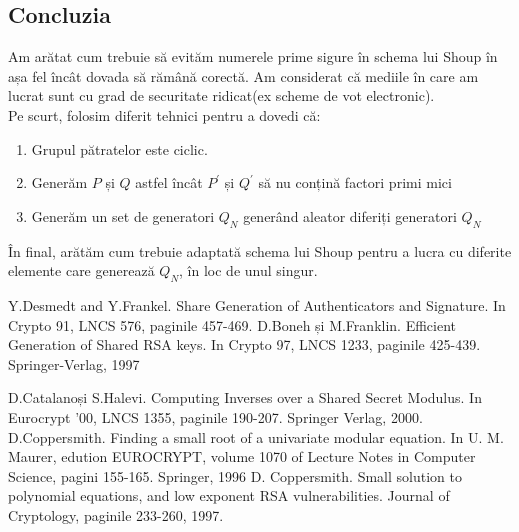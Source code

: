 \documentclass[12]{article}
\begin{document}
\subsection{Concluzia}
Am arătat cum trebuie să evităm numerele prime sigure în schema lui Shoup în așa fel încât dovada să rămână corectă. Am considerat că mediile în care am lucrat sunt cu grad de securitate ridicat(ex scheme de vot electronic).
\\ Pe scurt, folosim diferit tehnici pentru a dovedi că:
\begin{enumerate}
\item Grupul pătratelor este ciclic.

\item Generăm $P$ și $Q$ astfel încât $P^{'}$ și $Q^{'}$ să nu conțină factori primi mici

\item Generăm un set de generatori $Q_N$ generând aleator diferiți generatori $Q_N$
\end{enumerate} 
În final, arătăm cum trebuie adaptată schema lui Shoup pentru a lucra cu diferite elemente care generează $Q_N$, în loc de unul singur.








\medskip


\begin{thebibliography}{9}
Y.Desmedt and Y.Frankel. Share Generation of Authenticators and Signature. In Crypto 91, LNCS 576, paginile 457-469.
D.Boneh și M.Franklin. Efficient Generation of Shared RSA keys. In Crypto 97, LNCS 1233, paginile 425-439. Springer-Verlag, 1997

D.Catalanoși S.Halevi. Computing Inverses over a Shared Secret Modulus. In Eurocrypt '00, LNCS 1355, paginile 190-207. Springer Verlag, 2000.
D.Coppersmith. Finding a small root of a univariate modular equation. In U. M. Maurer, edution EUROCRYPT, volume 1070 of Lecture Notes in Computer Science, pagini 155-165. Springer, 1996
D. Coppersmith. Small solution to polynomial equations, and low exponent RSA vulnerabilities. Journal of Cryptology, paginile 233-260, 1997.


\
\end{thebibliography}
\end{document}
